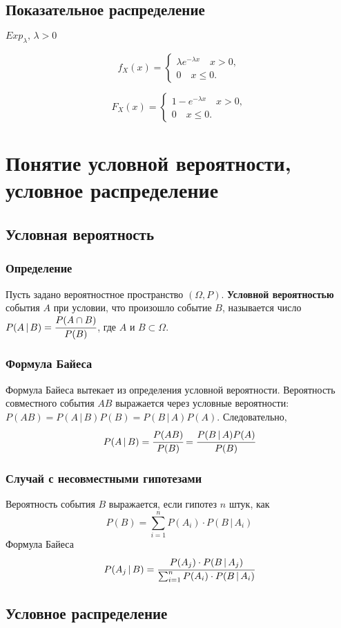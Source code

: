 \documentclass{article}
\begin{document}
\subsection{Показательное распределение}
$Exp_{\lambda},\,\lambda>0$

$$f_X(x)=\begin{cases}\lambda e^{-\lambda x}\quad x>0,\\0\quad x\leq 0.\end{cases}$$

$$F_X(x)=\begin{cases}1- e^{-\lambda x}\quad x>0,\\0\quad x\leq 0.\end{cases}$$
\newpage
\section{Понятие условной вероятности, условное распределение}
\subsection{Условная вероятность}
\subsubsection{Определение}
Пусть задано вероятностное пространство $(\Omega,P)$. \textbf{Условной вероятностью} события $A$ при условии, что произошло событие $B$, называется число $P(A\,|\,B)=\cfrac{P(A\cap B)}{P(B)}$, где $A$ и $B\subset\Omega$.
\subsubsection{Формула Байеса}
Формула Байеса вытекает из определения условной вероятности. Вероятность совместного события $AB$ выражается через условные вероятности: $P(AB)=P(A\,|\,B)P(B)=P(B\,|\,A)P(A)$. Следовательно, 
$$ P(A\,|\,B)=\cfrac{P(AB)}{P(B)}=\cfrac{P(B\,|\,A)P(A)}{P(B)} $$
\subsubsection{Случай с несовместными гипотезами}
Вероятность события $B$ выражается, если гипотез $n$ штук, как $$ P(B)=\sum_{i=1}^n P(A_i)\cdot P(B\,|\,A_i)$$
Формула Байеса
$$ P(A_j\,|\,B)=\cfrac{P(A_j)\cdot P(B\,|\,A_j)}{\sum_{i=1}^n P(A_i)\cdot P(B\,|\,A_i)}  $$
\subsection{Условное распределение}
\end{document}
